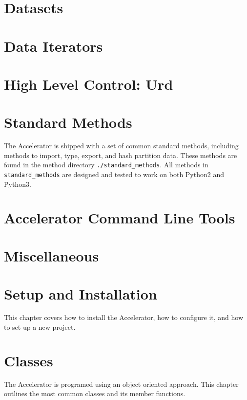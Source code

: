 \documentclass[a4paper]{report}
\begin{document}
\chapter{Datasets}


\chapter{Data Iterators}


\chapter{High Level Control:  Urd}


\chapter{Standard Methods}
The Accelerator is shipped with a set of common standard methods,
including methods to import, type, export, and hash partition data.
These methods are found in the method
directory \texttt{./standard\_methods}.  All methods
in \texttt{standard\_methods} are designed and tested to work on both
Python2 and Python3.



\chapter{Accelerator Command Line Tools}



\appendix

\chapter{Miscellaneous}


\chapter{Setup and Installation}
This chapter covers how to install the Accelerator, how to configure
it, and how to set up a new project.


\chapter{Classes}
The Accelerator is programed using an object oriented approach.  This
chapter outlines the most common classes and its member functions.






\end{document}
